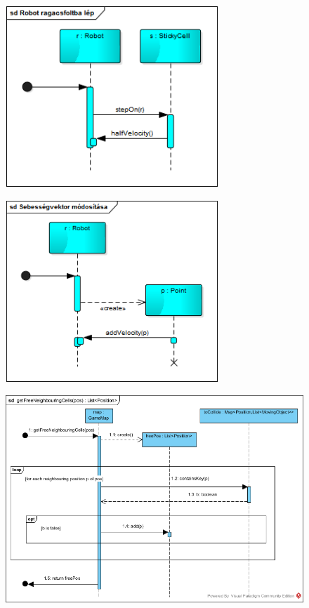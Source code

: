 \begin{figure}[!htbp]
	\begin{center}
		\includegraphics[width=80mm, center]{./chapters/chapter04/robotragacsbalep.png}
		\caption{}
	\end{center}
\end{figure}

\begin{figure}[!htbp]
	\begin{center}
		\includegraphics[width=80mm, center]{./chapters/chapter04/sebesseg.png}
		\caption{}
	\end{center}
\end{figure}

\begin{figure}[!htbp]
	\begin{center}
		\includegraphics[width=166mm, center]{./chapters/chapter04/szabadszomszedok.png}
		\caption{}
	\end{center}
\end{figure}

